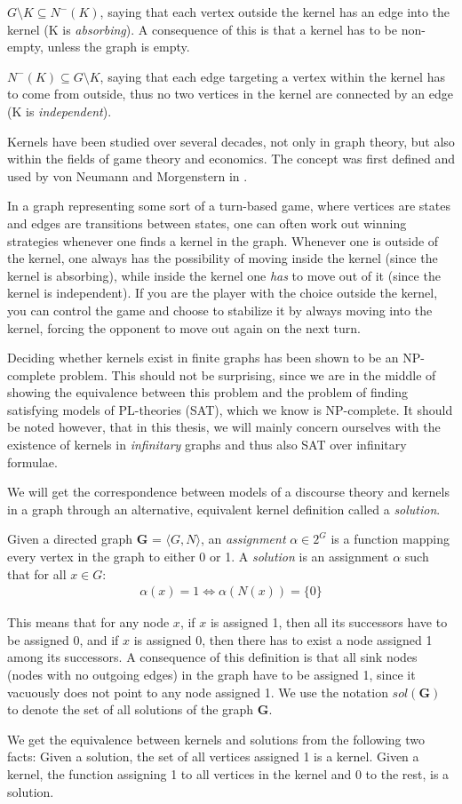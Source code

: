 $G \setminus K \subseteq N^-(K)$, saying that each vertex outside the kernel has an edge into the kernel (K is \textit{absorbing}).
A consequence of this is that a kernel has to be non-empty, unless the graph is empty.

$N^-(K) \subseteq G \setminus K$, saying that each edge targeting a vertex within the kernel has to come from outside, thus no two vertices in the kernel are connected by an edge (K is \textit{independent}).

Kernels have been studied over several decades, not only in graph theory, but also within the fields of game theory and economics.
The concept was first defined and used by von Neumann and Morgenstern in \cite{neumann}.

In a graph representing some sort of a turn-based game, where vertices are states and edges are transitions between states, one can often work out winning strategies whenever one finds a kernel in the graph.
Whenever one is outside of the kernel, one always has the possibility of moving inside the kernel (since the kernel is absorbing), while inside the kernel one \textit{has} to move out of it (since the kernel is independent).
If you are the player with the choice outside the kernel, you can control the game and choose to stabilize it by always moving into the kernel, forcing the opponent to move out again on the next turn.

Deciding whether kernels exist in finite graphs has been shown to be an NP-complete problem\cite{chvatal}.
This should not be surprising, since we are in the middle of showing the equivalence between this problem and the problem of finding satisfying models of PL-theories (SAT), which we know is NP-complete.
It should be noted however, that in this thesis, we will mainly concern ourselves with the existence of kernels in \textit{infinitary} graphs and thus also SAT over infinitary formulae.

We will get the correspondence between models of a discourse theory and kernels in a graph through an alternative, equivalent kernel definition called a \textit{solution}.
\begin{definition}
  Given a directed graph \textbf{G} = $\langle G,N \rangle$, an \textit{assignment} $\alpha \in 2^G$ is a function mapping every vertex in the graph to either 0 or 1.
  A \textit{solution} is an assignment $\alpha$ such that for all $x \in G:$
  \begin{align}
    \alpha(x) = 1 \iff \alpha(N(x)) = \{ 0 \}
  \end{align}
\end{definition}
This means that for any node $x$, if $x$ is assigned 1, then all its successors have to be assigned  0, and if $x$ is assigned 0, then there has to exist a node assigned 1 among its successors.
A consequence of this definition is that all sink nodes (nodes with no outgoing edges) in the graph have to be assigned 1, since it vacuously does not point to any node assigned 1.
We use the notation $sol(\mathbf{G})$ to denote the set of all solutions of the graph \textbf{G}.

We get the equivalence between kernels and solutions from the following two facts:
Given a solution, the set of all vertices assigned 1 is a kernel.
Given a kernel, the function assigning 1 to all vertices in the kernel and 0 to the rest, is a solution.
